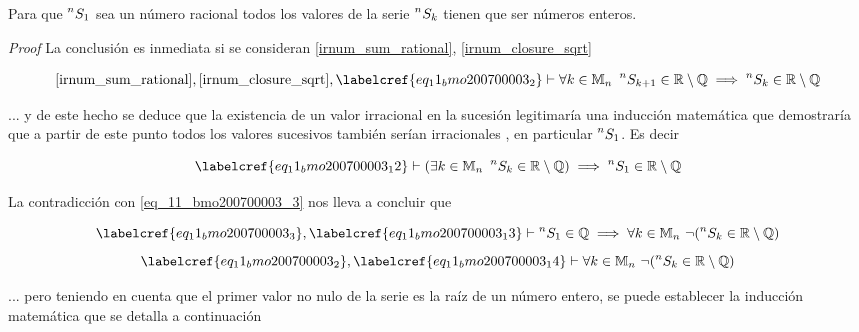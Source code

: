 \begin{claim}
	Para que $\prescript{n}{}{S_1}$ sea un número racional todos los valores de la serie $\prescript{n}{}{S_k}$ tienen que ser números enteros.
\end{claim}

\textit{Proof} La conclusión es inmediata si se consideran \cref*{irnum_sum_rational}, \cref{irnum_closure_sqrt}

\begin{equation} \label{eq_11_bmo200700003_12}
	\cref{irnum_sum_rational}, \cref{irnum_closure_sqrt}, \labelcref{eq_11_bmo200700003_2} \vdash \forall k \in \mathbb{M}_n\ \prescript{n}{}{S_{k+1}} \in \mathbb{R} \setminus \mathbb{Q} \implies \prescript{n}{}{S_{k}} \in \mathbb{R} \setminus \mathbb{Q}
\end{equation}

... y de este hecho se deduce que la existencia de un valor irracional en la sucesión legitimaría una inducción matemática que demostraría que a partir de este punto todos los valores sucesivos también serían irracionales , en particular $\prescript{n}{}{S_1}$. Es decir 

\begin{equation} \label{eq_11_bmo200700003_13}
	\labelcref{eq_11_bmo200700003_12} \vdash (\exists k \in \mathbb{M}_n\ \prescript{n}{}{S_{k}} \in \mathbb{R} \setminus \mathbb{Q}) \implies \prescript{n}{}{S_{1}} \in \mathbb{R} \setminus \mathbb{Q}
\end{equation}

La contradicción con \cref{eq_11_bmo200700003_3} nos lleva a concluir que 

\begin{equation} \label{eq_11_bmo200700003_14}
	\labelcref{eq_11_bmo200700003_3}, \labelcref{eq_11_bmo200700003_13} \vdash \prescript{n}{}{S_{1}} \in \mathbb{Q} \implies \forall k \in \mathbb{M}_n\ \neg(\prescript{n}{}{S_{k}} \in \mathbb{R} \setminus \mathbb{Q})
\end{equation}
\begin{equation} \label{eq_11_bmo200700003_15}
	\labelcref{eq_11_bmo200700003_2}, \labelcref{eq_11_bmo200700003_14} \vdash \forall k \in \mathbb{M}_n\ \neg(\prescript{n}{}{S_{k}} \in \mathbb{R} \setminus \mathbb{Q})
\end{equation}

... pero teniendo en cuenta que el primer valor no nulo de la serie es la raíz de un número entero, se puede establecer la inducción matemática que se detalla a continuación

